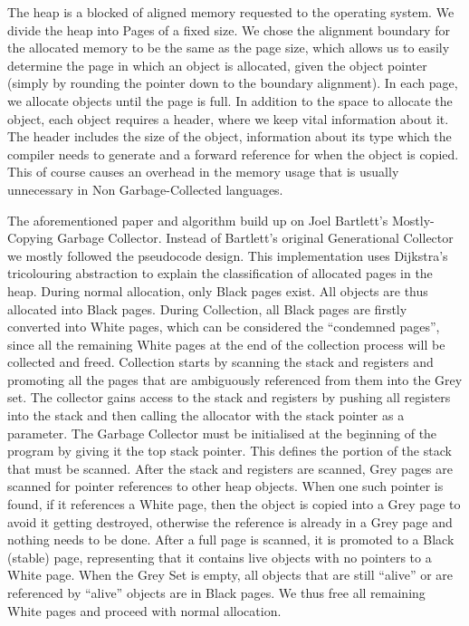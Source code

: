 \documentclass{article}
\begin{document}
The heap is a blocked of aligned memory requested to the operating system. We divide the heap into Pages of a fixed
size. We chose the alignment boundary for the allocated memory to be the same as the page size, which allows us
to easily determine the page in which an object is allocated, given the object pointer (simply by rounding the pointer
down to the boundary alignment). In each page, we allocate objects until the page is full. In addition to the space 
to allocate the object, each object requires a header, where we keep vital information about it. The header includes the size of the object, information about its type which the compiler needs to generate and a forward reference for when the object is copied. This of course causes an overhead in the memory usage that is usually unnecessary in Non Garbage-Collected languages. 


The aforementioned paper and algorithm build up on Joel Bartlett's Mostly-Copying Garbage Collector. Instead of 
Bartlett's original Generational Collector we mostly followed the pseudocode design. This implementation uses Dijkstra's tricolouring 
abstraction to explain the classification of allocated pages in the heap. During normal allocation, only Black pages 
exist. All objects are thus allocated into Black pages. During Collection, all Black pages are firstly converted into White 
pages, which can be considered the ``condemned pages'', since all the remaining White pages at the end of the collection 
process will be collected and freed. Collection starts by scanning the stack and registers and promoting all the pages 
that are ambiguously referenced from them into the Grey set. The collector gains access to the stack and registers by pushing all registers into the stack and then calling the allocator with the stack pointer as a parameter. The Garbage Collector must be initialised at the beginning of the program by giving it the top stack pointer. This defines the portion of the stack that must be scanned. After the stack and registers are scanned, Grey pages are scanned for pointer references to other heap objects. When one such pointer is found, if it references a White page, then the object is copied into a Grey page to avoid it getting destroyed, otherwise the reference is already in a Grey page and nothing needs to be done. After a full page is scanned, it is promoted to a Black (stable) page, representing that it contains live objects with no pointers to a White page. When the Grey Set is empty, all objects that are still ``alive'' or are referenced by ``alive'' objects are in Black pages. We thus free all remaining White pages and proceed with normal allocation. 
\end{document}
